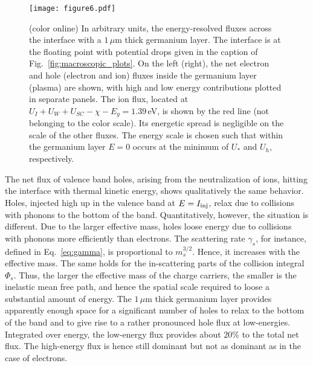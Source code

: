 \documentclass[pre,reprint,floats]{revtex4-1}
\begin{document}
\begin{figure}[t]
\texttt{[image: figure6.pdf]}
\caption{(color online) In arbitrary units, the energy-resolved fluxes across 
the interface with a $1\,\mu\mathrm{m}$ thick germanium layer. The interface is at the 
floating point with potential drops given in the caption of Fig.~\ref{fig:macroscopic_plots}. 
On the left (right), the net electron and hole (electron and ion) fluxes inside 
the germanium layer (plasma) are shown, with high and low energy contributions plotted in separate 
panels. The ion flux, located at $U_I+U_W+U_{SC}-\chi-E_g=1.39\,$eV, is shown by the red line (not 
belonging to the color scale). Its energetic spread is negligible on the scale of the 
other fluxes. The energy scale is chosen such that within the germanium layer $E=0$ occurs at the 
minimum of $U_*$ and $U_h$, respectively.} 
\label{fig:flux_3d}
\end{figure}

The net flux of valence band holes, arising from the neutralization of ions, hitting the interface 
with thermal kinetic energy, shows qualitatively the same behavior. Holes, injected high up in the 
valence band at $E=I_{\rm inj}$, relax due to collisions with phonons to the bottom of the band.  
Quantitatively, however, the situation is different. Due to the larger effective mass, 
holes loose energy due to collisions with phonons more efficiently than electrons. The scattering 
rate $\gamma_{s}$, for instance, defined in Eq.~\eqref{eq:gamma}, is proportional to $m_s^{3/2}$. Hence,
it increases with the effective mass. The same holds for the in-scattering parts of the collision
integral $\Phi_{s}$. Thus, the larger the effective mass of the charge carriers, the smaller is
the inelastic mean free path, and hence the spatial scale required to loose a substantial amount
of energy. The $1\,\mu\mathrm{m}$ thick germanium layer provides apparently enough space for a 
significant number of holes to relax to the bottom of the band and to give rise to a rather 
pronounced hole flux at low-energies. Integrated over energy, the low-energy flux 
provides about $20\%$ to the total net flux. The high-energy flux is hence still dominant but 
not as dominant as in the case of electrons. 
\end{document}
